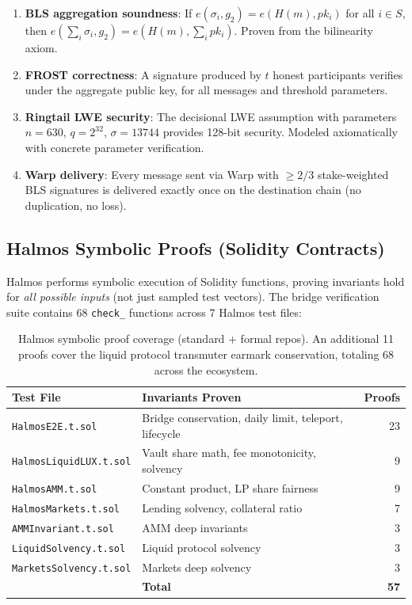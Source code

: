 \documentclass[11pt]{article}
\begin{document}
\begin{enumerate}[leftmargin=1.1em]
  \item \textbf{BLS aggregation soundness}: If $e(\sigma_i, g_2) = e(H(m), pk_i)$ for all $i \in S$, then $e(\sum_i \sigma_i, g_2) = e(H(m), \sum_i pk_i)$. Proven from the bilinearity axiom.
  \item \textbf{FROST correctness}: A signature produced by $t$ honest participants verifies under the aggregate public key, for all messages and threshold parameters.
  \item \textbf{Ringtail LWE security}: The decisional LWE assumption with parameters $n = 630$, $q = 2^{32}$, $\sigma = 13744$ provides 128-bit security. Modeled axiomatically with concrete parameter verification.
  \item \textbf{Warp delivery}: Every message sent via Warp with $\geq 2/3$ stake-weighted BLS signatures is delivered exactly once on the destination chain (no duplication, no loss).
\end{enumerate}

\subsection{Halmos Symbolic Proofs (Solidity Contracts)}

Halmos \cite{halmos} performs symbolic execution of Solidity functions, proving invariants hold for \emph{all possible inputs} (not just sampled test vectors). The bridge verification suite contains 68 \texttt{check\_} functions across 7 Halmos test files:

\begin{table}[h]
\centering
\begin{tabular}{llr}
\toprule
\textbf{Test File} & \textbf{Invariants Proven} & \textbf{Proofs} \\
\midrule
\texttt{HalmosE2E.t.sol} & Bridge conservation, daily limit, teleport, lifecycle & 23 \\
\texttt{HalmosLiquidLUX.t.sol} & Vault share math, fee monotonicity, solvency & 9 \\
\texttt{HalmosAMM.t.sol} & Constant product, LP share fairness & 9 \\
\texttt{HalmosMarkets.t.sol} & Lending solvency, collateral ratio & 7 \\
\texttt{AMMInvariant.t.sol} & AMM deep invariants & 3 \\
\texttt{LiquidSolvency.t.sol} & Liquid protocol solvency & 3 \\
\texttt{MarketsSolvency.t.sol} & Markets deep solvency & 3 \\
\midrule
& \textbf{Total} & \textbf{57} \\
\bottomrule
\end{tabular}
\caption{Halmos symbolic proof coverage (standard + formal repos). An additional 11 proofs cover the liquid protocol transmuter earmark conservation, totaling 68 across the ecosystem.}
\end{table}
\end{document}
